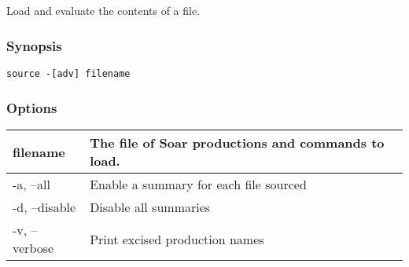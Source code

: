 \subsection{}
\label{source}
Load and evaluate the contents of a file. 
\subsubsection*{Synopsis}
\begin{verbatim}
source -[adv] filename
\end{verbatim}
\subsubsection*{Options}
\begin{tabular}{|l|l|}
\hline 
filename & The file of Soar productions and commands to load.  \\
 \hline 
 -a, --all  & Enable a summary for each file sourced  \\
 \hline 
 -d, --disable  & Disable all summaries  \\
 \hline 
 -v, --verbose  & Print excised production names  \\
 \hline 
\end{tabular}
